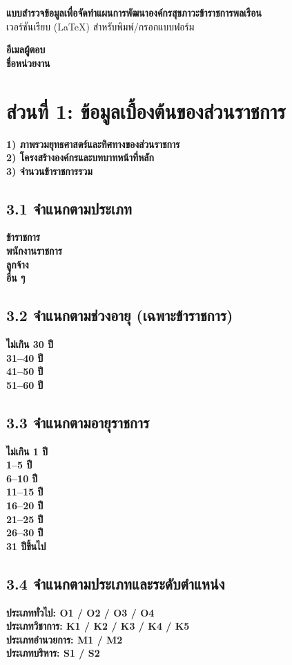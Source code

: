 \documentclass[12pt,a4paper]{article}
\newcommand{\linefield}[1]{\textbf{#1} \hrulefill}
\newcommand{\spacer}{\vspace{0.6em}}
\begin{document}
{\Large\textbf{แบบสำรวจข้อมูลเพื่อจัดทำแผนการพัฒนาองค์กรสุขภาวะข้าราชการพลเรือน}}\\
เวอร์ชันเรียบ (LaTeX) สำหรับพิมพ์/กรอกแบบฟอร์ม

\spacer
\linefield{อีเมลผู้ตอบ}\\[0.6em]
\linefield{ชื่อหน่วยงาน}

\section*{ส่วนที่ 1: ข้อมูลเบื้องต้นของส่วนราชการ}
\linefield{1) ภาพรวมยุทธศาสตร์และทิศทางของส่วนราชการ}\\[2.2em]
\linefield{2) โครงสร้างองค์กรและบทบาทหน้าที่หลัก}\\[2.2em]
\linefield{3) จำนวนข้าราชการรวม}

\subsection*{3.1 จำแนกตามประเภท}
\linefield{ข้าราชการ}\\
\linefield{พนักงานราชการ}\\
\linefield{ลูกจ้าง}\\
\linefield{อื่น ๆ}

\subsection*{3.2 จำแนกตามช่วงอายุ (เฉพาะข้าราชการ)}
\linefield{ไม่เกิน 30 ปี}\\
\linefield{31--40 ปี}\\
\linefield{41--50 ปี}\\
\linefield{51--60 ปี}

\subsection*{3.3 จำแนกตามอายุราชการ}
\linefield{ไม่เกิน 1 ปี}\\
\linefield{1--5 ปี}\\
\linefield{6--10 ปี}\\
\linefield{11--15 ปี}\\
\linefield{16--20 ปี}\\
\linefield{21--25 ปี}\\
\linefield{26--30 ปี}\\
\linefield{31 ปีขึ้นไป}

\subsection*{3.4 จำแนกตามประเภทและระดับตำแหน่ง}
\linefield{ประเภททั่วไป: O1 / O2 / O3 / O4}\\
\linefield{ประเภทวิชาการ: K1 / K2 / K3 / K4 / K5}\\
\linefield{ประเภทอำนวยการ: M1 / M2}\\
\linefield{ประเภทบริหาร: S1 / S2}
\end{document}
